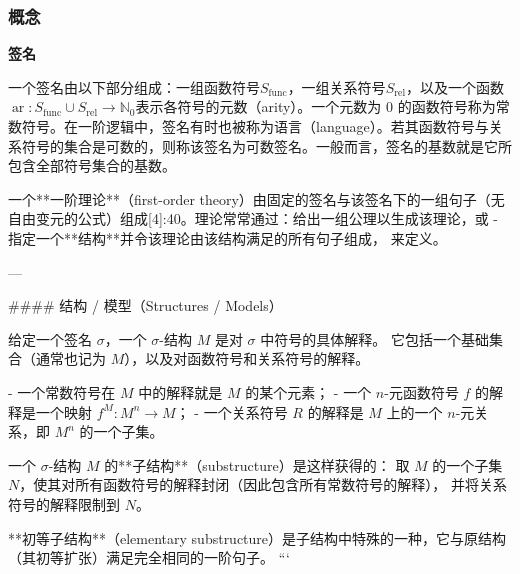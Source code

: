 \subsubsection{概念}
\textbf{签名}

一个签名由以下部分组成：一组函数符号\(S_{\text{func}}\)，一组关系符号\(S_{\text{rel}}\)，以及一个函数\(\operatorname{ar} : S_{\text{func}} \cup S_{\text{rel}} \to \mathbb{N}_0\)表示各符号的元数（arity）。一个元数为 0 的函数符号称为常数符号。在一阶逻辑中，签名有时也被称为语言（language）。若其函数符号与关系符号的集合是可数的，则称该签名为可数签名。一般而言，签名的基数就是它所包含全部符号集合的基数。

一个**一阶理论**（first-order theory）由固定的签名与该签名下的一组句子（无自由变元的公式）组成[4]:40。理论常常通过：给出一组公理以生成该理论，或  
- 指定一个**结构**并令该理论由该结构满足的所有句子组成，  
来定义。

---

#### 结构 / 模型（Structures / Models）

给定一个签名 \(\sigma\)，一个 \(\sigma\)-结构 \(M\) 是对 \(\sigma\) 中符号的具体解释。  
它包括一个基础集合（通常也记为 \(M\)），以及对函数符号和关系符号的解释。

- 一个常数符号在 \(M\) 中的解释就是 \(M\) 的某个元素；  
- 一个 \(n\)-元函数符号 \(f\) 的解释是一个映射 \(f^M : M^n \to M\)；  
- 一个关系符号 \(R\) 的解释是 \(M\) 上的一个 \(n\)-元关系，即 \(M^n\) 的一个子集。

一个 \(\sigma\)-结构 \(M\) 的**子结构**（substructure）是这样获得的：  
取 \(M\) 的一个子集 \(N\)，使其对所有函数符号的解释封闭（因此包含所有常数符号的解释），  
并将关系符号的解释限制到 \(N\)。  

**初等子结构**（elementary substructure）是子结构中特殊的一种，它与原结构（其初等扩张）满足完全相同的一阶句子。
```
